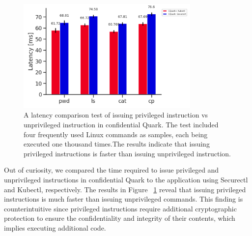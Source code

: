 \begin{figure}[H]
    \centering
    \includegraphics[width=0.8\textwidth]{images/speed_of_issuing_cmd_in_cquark_kubctl_securectl.PNG}
    \caption[Benchmark result - Latency Comparison of issuing privileged instruction vs unprivileged instruction in confidential Quark]{A latency comparison test of issuing privileged instruction vs unprivileged instruction in confidential Quark.  The test included four frequently used Linux 
    commands as samples, each being executed one thousand times.The results indicate that issuing privileged instructions is faster than issuing unprivileged instruction.
    }
    \label{fig:speed_of_issuing_cmd_in_cquark_kubctl_securectl}
\end{figure}


Out of curiosity, we compared the time required to issue privileged and unprivileged instructions in confidential Quark to the application using Securectl and Kubectl, respectively. The results in Figure ~\ref{fig:speed_of_issuing_cmd_in_cquark_kubctl_securectl} reveal that issuing privileged 
instructions is much faster than issuing unprivileged commands. This finding is counterintuitive since privileged instructions require additional cryptographic protection to ensure the confidentiality and integrity of their contents, which implies executing additional code.

